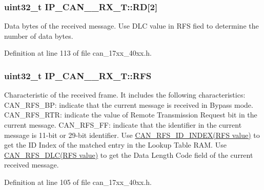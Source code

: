 \subsubsection[{\texorpdfstring{RD}{RD}}]{ uint32\+\_\+t I\+P\+\_\+\+C\+A\+N\+\_\+\_\+\+R\+X\+\_\+\+T\+::\+RD\mbox{[}2\mbox{]}}\hypertarget{structIP__CAN__001__RX__T_a7b9fd4220efbbd69d33c81d887803b69}{}\label{structIP__CAN__001__RX__T_a7b9fd4220efbbd69d33c81d887803b69}
Data bytes of the received message. Use D\+LC value in R\+FS fied to determine the number of data bytes. 

Definition at line 113 of file can\+\_\+17xx\+\_\+40xx.\+h.

\subsubsection[{\texorpdfstring{R\+FS}{RFS}}]{ uint32\+\_\+t I\+P\+\_\+\+C\+A\+N\+\_\+\_\+\+R\+X\+\_\+\+T\+::\+R\+FS}\hypertarget{structIP__CAN__001__RX__T_aa5c1bc243bb1763d92e9070d84b594cf}{}\label{structIP__CAN__001__RX__T_aa5c1bc243bb1763d92e9070d84b594cf}
Characteristic of the received frame. It includes the following characteristics\+: C\+A\+N\+\_\+\+R\+F\+S\+\_\+\+BP\+: indicate that the current message is received in Bypass mode. C\+A\+N\+\_\+\+R\+F\+S\+\_\+\+R\+TR\+: indicate the value of Remote Transmission Request bit in the current message. C\+A\+N\+\_\+\+R\+F\+S\+\_\+\+FF\+: indicate that the identifier in the current message is 11-\/bit or 29-\/bit identifier. Use \hyperlink{group__CAN__17XX__40XX_gac392aec22ad3737b7750bb77e173fb72}{C\+A\+N\+\_\+\+R\+F\+S\+\_\+\+I\+D\+\_\+\+I\+N\+D\+E\+X(\+R\+F\+S value)} to get the ID Index of the matched entry in the Lookup Table R\+AM. Use \hyperlink{group__CAN__17XX__40XX_ga6f8438ca8831affefb0c9dbad9bdf9f0}{C\+A\+N\+\_\+\+R\+F\+S\+\_\+\+D\+L\+C(\+R\+F\+S value)} to get the Data Length Code field of the current received message. 

Definition at line 105 of file can\+\_\+17xx\+\_\+40xx.\+h.

